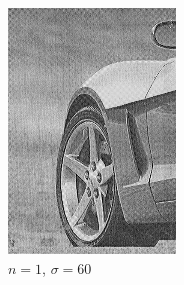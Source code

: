 \documentclass[
	12pt, %
]{style/fphw}
\begin{document}
\begin{figure}[H]
\begin{subfigure}[b]{.22\textwidth}
             \includegraphics[width=\textwidth]{plots2/Q5_3_2_60.png}
             \caption{$n=1$, $\sigma=60$}
             \label{Q5_3_1_60}
         \end{subfigure}
         \hfill
         \begin{subfigure}[b]{.22\textwidth}
             \centering

\end{subfigure}
\end{figure}
\end{document}

